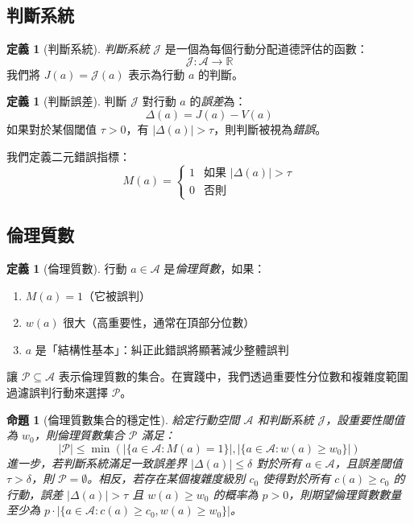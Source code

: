 \documentclass[12pt,a4paper]{article}
\newtheorem{proposition}[theorem]{命題}
\theoremstyle{definition}
\newtheorem{definition}[theorem]{定義}
\theoremstyle{remark}
\begin{document}
\subsection{判斷系統}

\begin{definition}[判斷系統]
\emph{判斷系統} $\mathcal{J}$ 是一個為每個行動分配道德評估的函數：
\[
\mathcal{J}: \mathcal{A} \to \mathbb{R}
\]
我們將 $J(a) = \mathcal{J}(a)$ 表示為行動 $a$ 的判斷。
\end{definition}

\begin{definition}[判斷誤差]
判斷 $\mathcal{J}$ 對行動 $a$ 的\emph{誤差}為：
\[
\Delta(a) = J(a) - V(a)
\]
如果對於某個閾值 $\tau > 0$，有 $|\Delta(a)| > \tau$，則判斷被視為\emph{錯誤}。
\end{definition}

我們定義二元錯誤指標：
\[
M(a) = \begin{cases}
1 & \text{如果 } |\Delta(a)| > \tau \\
0 & \text{否則}
\end{cases}
\]

\subsection{倫理質數}

\begin{definition}[倫理質數]
行動 $a \in \mathcal{A}$ 是\emph{倫理質數}，如果：
\begin{enumerate}
    \item $M(a) = 1$（它被誤判）
    \item $w(a)$ 很大（高重要性，通常在頂部分位數）
    \item $a$ 是「結構性基本」：糾正此錯誤將顯著減少整體誤判
\end{enumerate}
\end{definition}

讓 $\mathcal{P} \subseteq \mathcal{A}$ 表示倫理質數的集合。在實踐中，我們透過重要性分位數和複雜度範圍過濾誤判行動來選擇 $\mathcal{P}$。

\begin{proposition}[倫理質數集合的穩定性]
\label{prop:prime_stability}
給定行動空間 $\mathcal{A}$ 和判斷系統 $\mathcal{J}$，設重要性閾值為 $w_0$，則倫理質數集合 $\mathcal{P}$ 滿足：
\[
|\mathcal{P}| \leq \min\left(|\{a \in \mathcal{A} : M(a) = 1\}|, |\{a \in \mathcal{A} : w(a) \geq w_0\}|\right)
\]
進一步，若判斷系統滿足一致誤差界 $|\Delta(a)| \leq \delta$ 對於所有 $a \in \mathcal{A}$，且誤差閾值 $\tau > \delta$，則 $\mathcal{P} = \emptyset$。相反，若存在某個複雜度級別 $c_0$ 使得對於所有 $c(a) \geq c_0$ 的行動，誤差 $|\Delta(a)| > \tau$ 且 $w(a) \geq w_0$ 的概率為 $p > 0$，則期望倫理質數數量至少為 $p \cdot |\{a \in \mathcal{A} : c(a) \geq c_0, w(a) \geq w_0\}|$。
\end{proposition}
\end{document}
